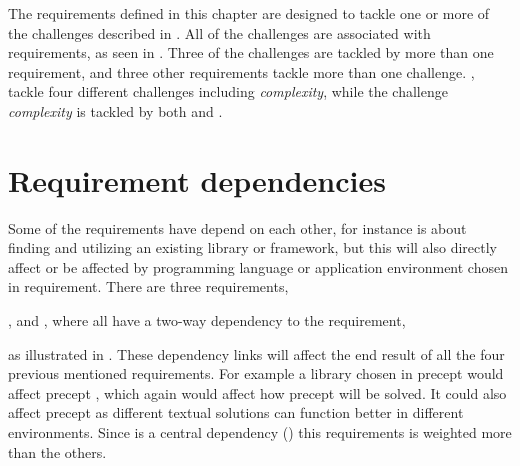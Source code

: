 The requirements defined in this chapter are designed to tackle one or more of the challenges
described in .
All of the challenges are associated with requirements, as seen in .
Three of the challenges are tackled by more than one requirement, and three other requirements
tackle more than one challenge.
\eg,  tackle four different challenges including \emph{complexity},
while the challenge \emph{complexity} is tackled by both 
 and .

\section{Requirement dependencies}


Some of the requirements have depend on each other, for instance  is about finding
and utilizing an existing library or framework, but this will also directly affect or be affected by
programming language or application environment chosen in  requirement.
There are three requirements, 
\begin{ii}
  \iitem {},
  \iitem {} and
  \iitem {},
    where all have a two-way dependency to the 
  \iitem {} requirement,
\end{ii}
as illustrated in .
These dependency links will affect the end result of all the four previous mentioned requirements.
For example a library chosen in precept  would affect precept , which again would affect
how precept  will be solved. 
It could also affect precept  as different textual solutions can function better in
different environments.
Since  is a central dependency ()
this requirements is weighted more than the others.

